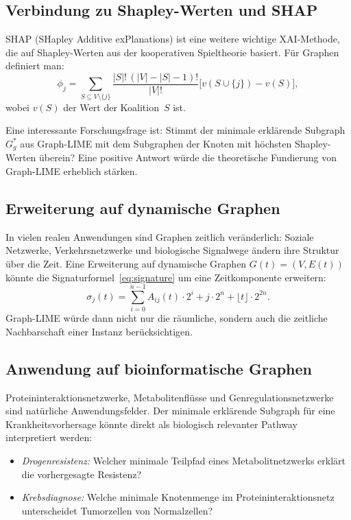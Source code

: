 ﻿\documentclass[a4paper,12pt]{article}
\theoremstyle{definition}
\begin{document}
\subsection{Verbindung zu Shapley-Werten und SHAP}

SHAP (SHapley Additive exPlanations) \citep{Lundberg2017} ist eine weitere
wichtige XAI-Methode, die auf Shapley-Werten aus der kooperativen Spieltheorie
basiert. Für Graphen definiert man:
\[
  \phi_j = \sum_{S \subseteq V \setminus \{j\}}
  \frac{|S|!\,(|V|-|S|-1)!}{|V|!}
  \bigl[v(S \cup \{j\}) - v(S)\bigr],
\]
wobei $v(S)$ der Wert der Koalition~$S$ ist.

Eine interessante Forschungsfrage ist: Stimmt der minimale erklärende Subgraph
$G^*_g$ aus Graph-LIME mit dem Subgraphen der Knoten mit höchsten Shapley-Werten
überein?
Eine positive Antwort würde die theoretische Fundierung von Graph-LIME
erheblich stärken.

\subsection{Erweiterung auf dynamische Graphen}

In vielen realen Anwendungen sind Graphen zeitlich veränderlich:
Soziale Netzwerke, Verkehrsnetzwerke und biologische Signalwege ändern ihre
Struktur über die Zeit.
Eine Erweiterung auf dynamische Graphen $G(t) = (V, E(t))$ könnte
die Signaturformel~\eqref{eq:signature} um eine Zeitkomponente erweitern:
\[
  \sigma_j(t) = \sum_{i=0}^{n-1} A_{ij}(t) \cdot 2^i + j \cdot 2^n
                + \lfloor t \rfloor \cdot 2^{2n}.
\]
Graph-LIME würde dann nicht nur die räumliche, sondern auch die zeitliche
Nachbarschaft einer Instanz berücksichtigen.

\subsection{Anwendung auf bioinformatische Graphen}

Proteininteraktionsnetzwerke, Metabolitenflüsse und Genregulationsnetzwerke
sind natürliche Anwendungsfelder.
Der minimale erklärende Subgraph für eine Krankheitsvorhersage könnte direkt
als biologisch relevanter Pathway interpretiert werden:
\begin{itemize}
  \item \emph{Drogenresistenz:} Welcher minimale Teilpfad eines Metabolitnetzwerks
        erklärt die vorhergesagte Resistenz?
  \item \emph{Krebsdiagnose:} Welche minimale Knotenmenge im Proteininteraktionsnetz
        unterscheidet Tumorzellen von Normalzellen?
\end{itemize}
\end{document}
